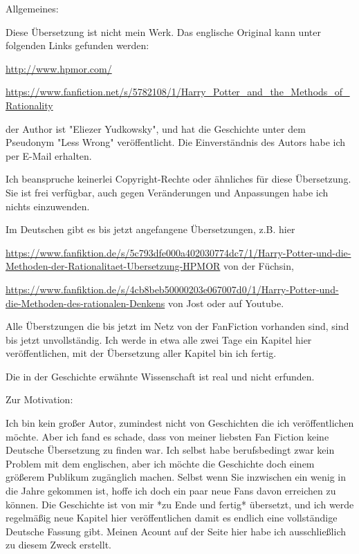 

\hypertarget{einfuxfchrung}{%

Allgemeines:

Diese Übersetzung ist nicht mein Werk. Das englische Original kann unter folgenden Links gefunden werden:

\url{http://www.hpmor.com/}\strut 

\url{https://www.fanfiction.net/s/5782108/1/Harry_Potter_and_the_Methods_of_Rationality}\strut 

der Author ist "Eliezer Yudkowsky", und hat die Geschichte unter dem Pseudonym "Less Wrong" veröffentlicht. Die Einverständnis des Autors habe ich per E-Mail erhalten.

Ich beanspruche keinerlei Copyright-Rechte oder ähnliches für diese Übersetzung. Sie ist frei verfügbar, auch gegen Veränderungen und Anpassungen habe ich nichts einzuwenden.

Im Deutschen gibt es bis jetzt angefangene Übersetzungen, z.B. hier

\url{https://www.fanfiktion.de/s/5c793dfe000a402030774dc7/1/Harry-Potter-und-die-Methoden-der-Rationalitaet-Ubersetzung-HPMOR} von der Füchsin,

\url{https://www.fanfiktion.de/s/4cb8beb50000203e067007d0/1/Harry-Potter-und-die-Methoden-des-rationalen-Denkens} von Jost oder auf Youtube.

Alle Überstzungen die bis jetzt im Netz von der FanFiction vorhanden sind, sind bis jetzt unvollständig. Ich werde in etwa alle zwei Tage ein Kapitel hier veröffentlichen, mit der Übersetzung aller Kapitel bin ich fertig.

Die in der Geschichte erwähnte Wissenschaft ist real und nicht erfunden.

Zur Motivation:

Ich bin kein großer Autor, zumindest nicht von Geschichten die ich veröffentlichen möchte. Aber ich fand es schade, dass von meiner liebsten Fan Fiction keine Deutsche Übersetzung zu finden war. Ich selbst habe berufsbedingt zwar kein Problem mit dem englischen, aber ich möchte die Geschichte doch einem größerem Publikum zugänglich machen. Selbst wenn Sie inzwischen ein wenig in die Jahre gekommen ist, hoffe ich doch ein paar neue Fans davon erreichen zu können. Die Geschichte ist von mir *zu Ende und fertig* übersetzt, und ich werde regelmäßig neue Kapitel hier veröffentlichen damit es endlich eine vollständige Deutsche Fassung gibt. Meinen Acount auf der Seite hier habe ich ausschließlich zu diesem Zweck erstellt.

}
